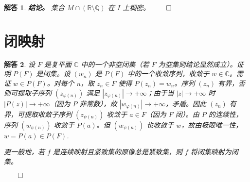 \documentclass[12pt,UTF8]{ctexbook}
\theoremstyle{exercisestyle}
\theoremstyle{solutionstyle}
\newtheorem*{solution*}{解答}
\newenvironment{solution}
  {\begin{solution*}}
  {\hfill\ensuremath{\qed}\end{solution*}}
\begin{document}
\begin{solution}
  \textbf{结论。} 集合 \( M \cap (\mathbb{R} \setminus \mathbb{Q}) \) 在 \( I \) 上稠密。
\end{solution}

\section{闭映射}\label{application-fermee}
\begin{solution}
  设 \( F \) 是复平面 \( \mathbb{C} \) 中的一个非空闭集（若 \( F \) 为空集则结论显然成立）。证明 \( P(F) \) 是闭集。设 \( (w_n) \) 是 \( P(F) \) 中的一个收敛序列，收敛于 \( w \in \mathbb{C} \)。需证 \( w \in P(F) \)。对每个 \( n \)，取 \( z_n \in F \) 使得 \( P(z_n) = w_n \)。序列 \( (z_n) \) 有界，否则可提取子序列 \( (z_{\varphi(n)}) \) 满足 \( |z_{\varphi(n)}| \to +\infty \)；由于当 \( |z| \to +\infty \) 时 \( |P(z)| \to +\infty \)（因为 \( P \) 非常数），故 \( |w_{\varphi(n)}| \to +\infty \)，矛盾。因此 \( (z_n) \) 有界，可提取收敛子序列 \( (z_{\psi(n)}) \) 收敛于 \( a \in F \)（因为 \( F \) 闭）。由 \( P \) 的连续性，序列 \( (w_{\psi(n)}) \) 收敛于 \( P(a) \)。但 \( (w_{\psi(n)}) \) 也收敛于 \( w \)，故由极限唯一性，\( w = P(a) \in P(F) \).

  更一般地，若 \( f \) 是连续映射且紧致集的原像总是紧致集，则 \( f \) 将闭集映射为闭集。

\end{solution}
\end{document}
